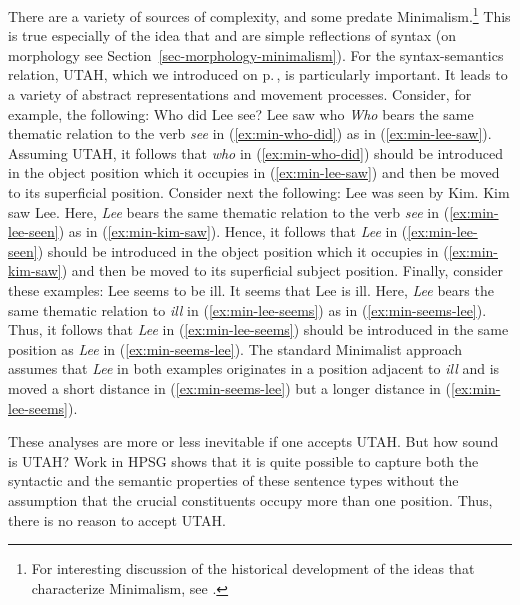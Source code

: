 \documentclass[output=paper]{langsci/langscibook}
\begin{document}
There are a variety of sources of complexity, and some predate Minimalism.\footnote{%
  For interesting discussion of the historical development of the ideas that characterize Minimalism, see \citet[Chapters~2 and~3]{CJ2005a}.%
}
This is true especially of the idea that  and  are simple reflections
of syntax (on morphology see Section~\ref{sec-morphology-minimalism}).
For the syntax-semantics relation, UTAH\indexutah, which we introduced on p.\,\pageref{ex:min-UTAH},
is particularly important. It leads to a variety of abstract representations and movement
processes. Consider, for example, the following: 
\eal
\ex Who did Lee see?\label{ex:min-who-did} 
\ex Lee saw who\label{ex:min-lee-saw}
\zl
\emph{Who} bears the same thematic relation to the verb \emph{see} in (\ref{ex:min-who-did}) as in
(\ref{ex:min-lee-saw}). Assuming UTAH, it follows that \emph{who} in (\ref{ex:min-who-did}) should
be introduced in the object position which it occupies in (\ref{ex:min-lee-saw}) and then be moved
to its superficial position. Consider next the following: 
\eal
\ex Lee was seen by Kim.\label{ex:min-lee-seen}
\ex Kim saw Lee.\label{ex:min-kim-saw}
\zl
Here, \emph{Lee} bears the same thematic relation to the verb \emph{see} in
(\ref{ex:min-lee-seen}) as in (\ref{ex:min-kim-saw}). Hence, it follows that \emph{Lee} in
(\ref{ex:min-lee-seen}) should be introduced in the object position which it occupies in
(\ref{ex:min-kim-saw}) and then be moved to its superficial subject position. Finally, consider
these examples:  
\eal\label{ex:min-lee}
\ex Lee seems to be ill.\label{ex:min-lee-seems}
\ex It seems that Lee is ill.\label{ex:min-seems-lee}
\zl
Here, \emph{Lee} bears the same thematic relation to \emph{ill} in (\ref{ex:min-lee-seems}) as in
(\ref{ex:min-seems-lee}). Thus, it follows that \emph{Lee} in (\ref{ex:min-lee-seems}) should be
introduced in the same position as \emph{Lee} in (\ref{ex:min-seems-lee}). The standard Minimalist
approach assumes that \emph{Lee} in both examples originates in a position adjacent to \emph{ill}
and is moved a short distance in (\ref{ex:min-seems-lee}) but a longer distance in
(\ref{ex:min-lee-seems}).  

These analyses are more or less inevitable if one accepts UTAH. But how sound is UTAH? Work in HPSG shows that it is quite possible to capture both the syntactic and the semantic properties of these sentence types without the assumption that the crucial constituents occupy more than one position. Thus, there is no reason to accept UTAH.
\end{document}
